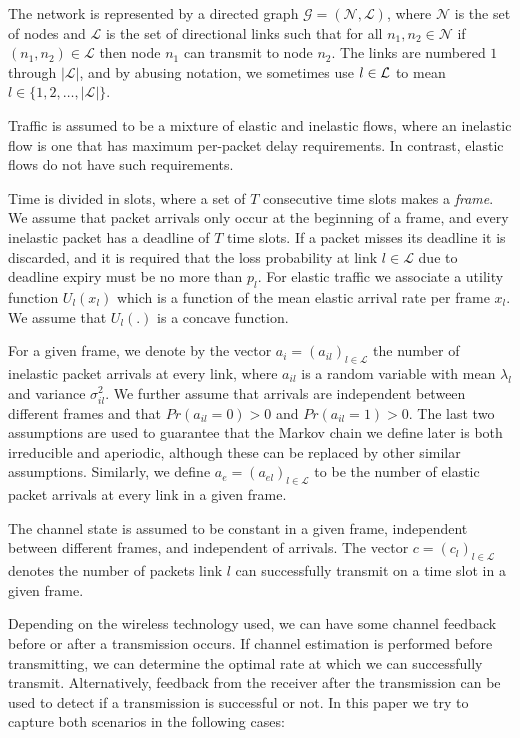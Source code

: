 \documentclass[conference]{IEEEtran}
\begin{document}
The network is represented by a directed graph $\mathcal{G}=( \mathcal{N},\mathcal{L} )$, where $\mathcal{N}$ is the set of nodes and $\mathcal{L}$ is the set of directional links such that for all $n_1,n_2 \in \mathcal{N}$ if $(n_1,n_2) \in \mathcal{L}$ then node $n_1$ can transmit to node $n_2$. The links are numbered $1$ through $|\mathcal{L}|$, and by abusing notation, we sometimes use $l \in \cal L$ to mean $l\in\{1,2,\ldots, |\mathcal{L}|\}$.

Traffic is assumed to be a mixture of elastic and inelastic flows, where an inelastic flow is one that has maximum per-packet delay requirements. In contrast, elastic flows do not have such requirements.

Time is divided in slots, where a set of $T$ consecutive time slots makes a \emph{frame}. We assume that packet arrivals only occur at the beginning of a frame, and every inelastic packet has a deadline of $T$ time slots. If a packet misses its deadline it is discarded, and it is required that the loss probability at link $l \in \mathcal{L}$ due to deadline expiry must be no more than $p_l$. For elastic traffic we associate a utility function $U_l(x_l)$ which is a function of the mean elastic arrival rate per frame $x_l$. We assume that $U_l(.)$ is a concave function.

For a given frame, we denote by the vector $a_i=( a_{il} )_{l \in \mathcal{L}}$ the number of inelastic packet arrivals at every link, where $a_{il}$ is a random variable with mean $\lambda_l$ and variance $\sigma^2_{il}$. We further assume that arrivals are independent between different frames and that $Pr(a_{il}=0)>0$ and $Pr(a_{il}=1)>0$. The last two assumptions are used to guarantee that the Markov chain we define later is both irreducible and aperiodic, although these can be replaced by other similar assumptions. Similarly, we define $a_e=( a_{el} )_{l \in \mathcal{L}}$ to be the number of elastic packet arrivals at every link in a given frame.

The channel state is assumed to be constant in a given frame, independent between different frames, and independent of arrivals. The vector $c=( c_l )_{l \in \mathcal{L}}$ denotes the number of packets link $l$ can successfully transmit on a time slot in a given frame.

Depending on the wireless technology used, we can have some channel feedback before or after a transmission occurs. If channel estimation is performed before transmitting, we can determine the optimal rate at which we can successfully transmit.  Alternatively, feedback from the receiver after the transmission can be used to detect if a transmission is successful or not. In this paper we try to capture both scenarios in the following cases:
\end{document}

